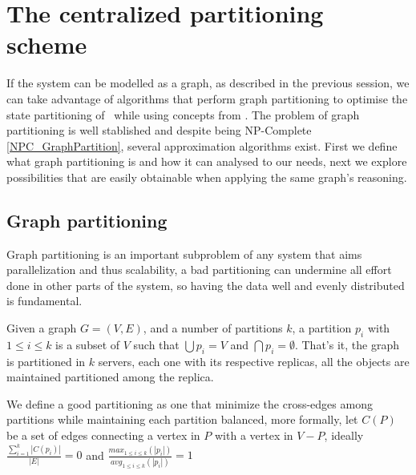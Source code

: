\section{The centralized partitioning scheme}



If the system can be modelled as a graph, as described in the previous session, we can take advantage of algorithms that perform graph partitioning to optimise the state partitioning of \ssmr\  while using concepts from \dssmr. The problem of graph partitioning is well stablished and despite being NP-Complete \ref{NPC_GraphPartition}, several approximation algorithms exist. First we define what graph partitioning is and how it can analysed to our needs, next we explore possibilities that are easily obtainable when applying the same graph's reasoning.

\subsection{Graph partitioning}
Graph partitioning is an important subproblem of any system that aims parallelization and thus scalability, a bad partitioning can undermine all effort done in other parts of the system, so having the data well and evenly distributed is fundamental.



Given a graph $G = (V, E)$, and a number of partitions $k$, a partition $p_i$ with $1 \leq i \leq k$ is a subset of $V$ such that $\bigcup p_i = V$ and $\bigcap p_i = \emptyset$. That's it, the graph is partitioned in $k$ servers, each one with its respective replicas, all the objects are maintained partitioned among the replica.

We define a good partitioning as one that minimize the cross-edges among partitions while maintaining each partition balanced, more formally, let $C(P)$ be a set of edges connecting a vertex in $P$ with a vertex in $V - P$, ideally $\frac{\sum_{i=1}^{k}|C(p_i)|}{|E|} = 0$ and $\frac{max_{1 \leq i \leq k}(|p_i|)}{avg_{1 \leq i \leq k}(|p_i|)} = 1$





